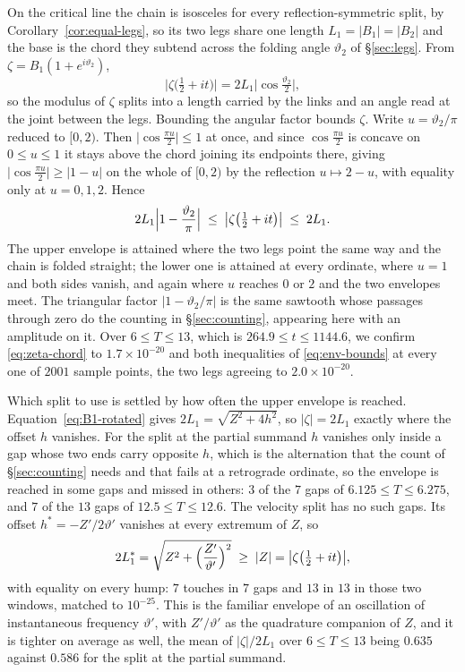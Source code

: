 \documentclass[11pt]{article}
\theoremstyle{definition}
\begin{document}
On the critical line the chain is isosceles for every reflection-symmetric
split, by Corollary~\ref{cor:equal-legs}, so its two legs share one length
$L_1=|B_1|=|B_2|$ and the base is the chord they subtend across the folding
angle $\vartheta_2$ of \S\ref{sec:legs}. From $\zeta=B_1(1+e^{i\vartheta_2})$,
\begin{equation}\label{eq:zeta-chord}
\bigl|\zeta\bigl(\tfrac12+it\bigr)\bigr|
=2L_1\bigl|\cos\tfrac{\vartheta_2}{2}\bigr| ,
\end{equation}
so the modulus of $\zeta$ splits into a length carried by the links and an angle
read at the joint between the legs. Bounding the angular factor bounds $\zeta$.
Write $u=\vartheta_2/\pi$ reduced to $[0,2)$. Then
$\bigl|\cos\tfrac{\pi u}{2}\bigr|\leq1$ at once, and since
$\cos\tfrac{\pi u}{2}$ is concave on $0\leq u\leq1$ it stays above the chord
joining its endpoints there, giving
$\bigl|\cos\tfrac{\pi u}{2}\bigr|\geq|1-u|$ on the whole of $[0,2)$ by the
reflection $u\mapsto2-u$, with equality only at $u=0,1,2$. Hence
\begin{equation}\label{eq:env-bounds}
2L_1\Bigl|1-\frac{\vartheta_2}{\pi}\Bigr|
\;\leq\;\bigl|\zeta\bigl(\tfrac12+it\bigr)\bigr|\;\leq\;2L_1 .
\end{equation}
The upper envelope is attained where the two legs point the same way and the
chain is folded straight; the lower one is attained at every ordinate, where
$u=1$ and both sides vanish, and again where $u$ reaches $0$ or $2$ and the two
envelopes meet. The triangular factor $|1-\vartheta_2/\pi|$ is the same sawtooth
whose passages through zero do the counting in \S\ref{sec:counting}, appearing
here with an amplitude on it. Over $6\leq T\leq13$, which is
$264.9\leq t\leq1144.6$, we confirm \eqref{eq:zeta-chord} to
$1.7\times10^{-20}$ and both inequalities of \eqref{eq:env-bounds} at every one
of $2001$ sample points, the two legs agreeing to $2.0\times10^{-20}$.

Which split to use is settled by how often the upper envelope is reached.
Equation~\eqref{eq:B1-rotated} gives $2L_1=\sqrt{Z^2+4h^2}$, so $|\zeta|=2L_1$
exactly where the offset $h$ vanishes. For the split at the partial
summand $h$ vanishes only inside a gap whose two ends carry opposite $h$, which
is the alternation that the count of \S\ref{sec:counting} needs and that fails at
a retrograde ordinate, so the envelope is reached in some gaps and missed in
others: $3$ of the $7$ gaps of $6.125\leq T\leq6.275$, and $7$ of the $13$ gaps
of $12.5\leq T\leq12.6$. The velocity split has no such gaps. Its offset
$h^{\ast}=-Z'/2\vartheta'$ vanishes at every extremum of $Z$, so
\begin{equation}\label{eq:env-star}
2L_1^{\ast}=\sqrt{Z^2+\Bigl(\frac{Z'}{\vartheta'}\Bigr)^{2}}
\;\geq\;|Z|=\bigl|\zeta\bigl(\tfrac12+it\bigr)\bigr| ,
\end{equation}
with equality on every hump: $7$ touches in $7$ gaps and $13$ in $13$ in those
two windows, matched to $10^{-25}$. This is the familiar envelope of an
oscillation of instantaneous frequency $\vartheta'$, with $Z'/\vartheta'$ as the
quadrature companion of $Z$, and it is tighter on average as well, the mean of
$|\zeta|/2L_1$ over $6\leq T\leq13$ being $0.635$ against $0.586$ for the split
at the partial summand.
\end{document}
